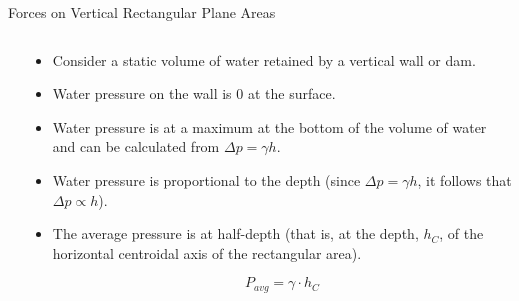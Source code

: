 \documentclass[9pt,xcolor={svgnames, x11names},professionalfonts, mathserif]{beamer}
\begin{document}
\begin{frame}{Forces on Vertical Rectangular Plane Areas}
 \begin{columns}
  \begin{column}[c]{0.38\textwidth}
  \end{column}
  \begin{column}[c]{0.58\textwidth}
   
   \begin{itemize}
    \item<1-5> Consider a static volume of water retained by a vertical wall or dam.
    \item<2-5> Water pressure on the wall is 0 at the surface.
    \item<3-5> Water pressure is at a maximum at the bottom of the volume of water
    and can be calculated from $\Delta p=\gamma h$.
    \item<4-5> Water pressure is proportional to the depth (since $\Delta p=\gamma h$,
    it follows that $\Delta p\propto h$).
    \item<5> The average pressure is at half-depth (that is, at the depth, $h_C$, of the horizontal centroidal axis of
    the rectangular area).
    \vspace{-0.25cm}
    
    \[	P_{avg}  =  \gamma\cdot h_C   \]
    

\end{itemize}
\end{column}
\end{columns}
\end{frame}
\end{document}
